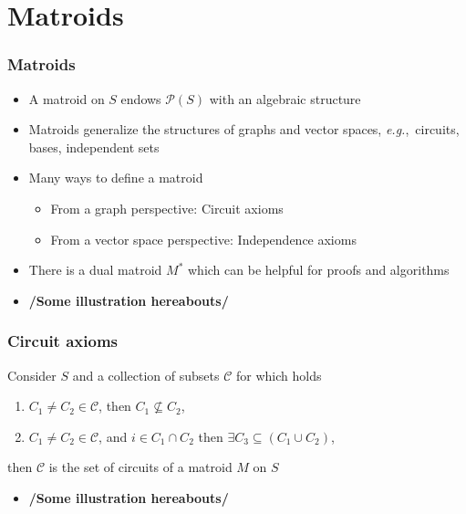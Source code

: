 \documentclass[bigger]{beamer}
\newcommand{\eg}{{\em e.g.},~}
\begin{document}
\section{Matroids}



\begin{frame}
\frametitle{Matroids}
\begin{itemize}


\item A matroid on $S$ endows $\mathcal{P}(S)$ with an algebraic
  structure 
\item Matroids generalize the structures of graphs and vector spaces,
  \eg circuits, bases, independent sets
\item Many ways to define a matroid
  \begin{itemize}
  \item From a graph perspective: Circuit axioms
  \item From a vector space perspective: Independence axioms
  \end{itemize}
\item There is a dual matroid $M^*$ which can be helpful for proofs and algorithms 
\item \textbf{/Some illustration hereabouts/}
\end{itemize} %
\end{frame}



\begin{frame}
\frametitle{Circuit axioms}

Consider $S$ and a collection of subsets $\mathscr{C}$ for which holds
\begin{enumerate}
\item $C_1 \neq C_2 \in \mathscr{C}$, then $C_1 \nsubseteq C_2$,
\item $C_1 \neq C_2 \in \mathscr{C}$, and $i \in C_1 \cap C_2$ then
   $\exists C_3 \subseteq (C_1 \cup C_2)$,
\end{enumerate}
then $\mathscr{C}$ is the set of circuits of a matroid $M$ on $S$
\begin{itemize}

\item \textbf{/Some illustration hereabouts/}

\end{itemize} %
\end{frame}
\end{document}
